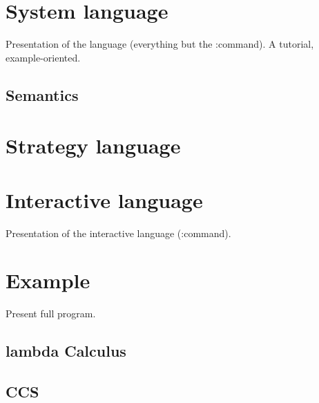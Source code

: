 \documentclass[12pt,a4paper]{article}
\begin{document}
\section{System language}
Presentation of the language (everything but the :command). A tutorial, example-oriented.

\subsection{Semantics}

\section{Strategy language}

\section{Interactive language}
Presentation of the interactive language (:command).

\section{Example}
Present full program.

\subsection{lambda Calculus}

\subsection{CCS}
\end{document}
